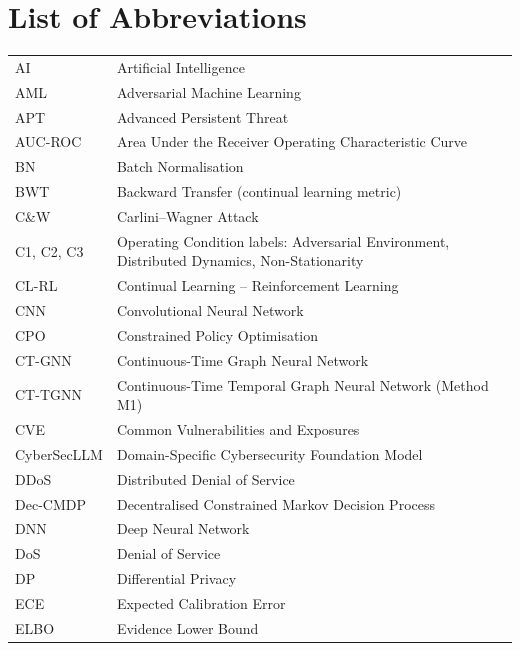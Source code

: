 
\chapter*{List of Abbreviations}

\begin{longtable}{@{}p{3.8cm} p{10cm}@{}}
AI & Artificial Intelligence \\
AML & Adversarial Machine Learning \\
APT & Advanced Persistent Threat \\
AUC-ROC & Area Under the Receiver Operating Characteristic Curve \\
BN & Batch Normalisation \\
BWT & Backward Transfer (continual learning metric) \\
C\&W & Carlini--Wagner Attack \\
C1, C2, C3 & Operating Condition labels: Adversarial Environment, Distributed Dynamics, Non-Stationarity \\
CL-RL & Continual Learning -- Reinforcement Learning \\
CNN & Convolutional Neural Network \\
CPO & Constrained Policy Optimisation \\
CT-GNN & Continuous-Time Graph Neural Network \\
CT-TGNN & Continuous-Time Temporal Graph Neural Network (Method M1) \\
CVE & Common Vulnerabilities and Exposures \\
CyberSecLLM & Domain-Specific Cybersecurity Foundation Model \\
DDoS & Distributed Denial of Service \\
Dec-CMDP & Decentralised Constrained Markov Decision Process \\
DNN & Deep Neural Network \\
DoS & Denial of Service \\
DP & Differential Privacy \\
ECE & Expected Calibration Error \\
ELBO & Evidence Lower Bound \\

\end{longtable}
